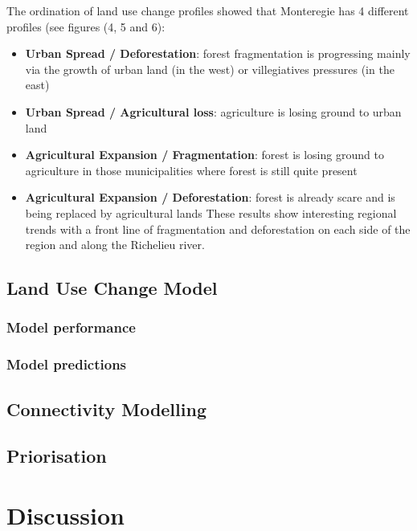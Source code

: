 The ordination of land use change profiles showed that Monteregie has 4 different profiles (see figures (4,  5 and 6):
\begin{itemize}
  \item \textbf{Urban Spread / Deforestation}: forest fragmentation is progressing mainly via the growth of urban land (in the west) or villegiatives pressures (in the east)
  \item \textbf{Urban Spread / Agricultural loss}: agriculture is losing ground to urban land
  \item \textbf{Agricultural Expansion / Fragmentation}: forest is losing ground to agriculture in those municipalities where forest is still quite present
  \item \textbf{Agricultural Expansion / Deforestation}: forest is already scare and is being replaced by agricultural lands
These results show interesting regional trends with a front line of fragmentation and deforestation on each side of the region and along the Richelieu river. \\ %
\end{itemize}

\subsection{Land Use Change Model}

\subsubsection{Model performance}

\subsubsection{Model predictions}

\subsection{Connectivity Modelling}

\subsection{Priorisation}

\section{Discussion}

\newpage
